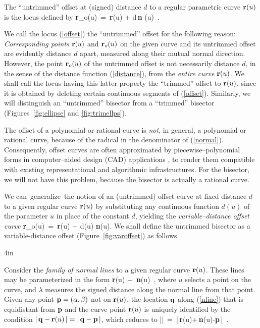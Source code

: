 \begin{dfn}
The ``untrimmed'' offset at (signed) distance $d$ to a regular parametric
curve ${\bf r}(u)$ is the locus defined by
\be \label{offset}
{\bf r}_o(u) \,=\, {\bf r}(u) + d\,{\bf n} (u) \,.
\ee
\end{dfn}

We call the locus (\ref{offset}) the ``untrimmed'' offset for the
following reason: {\it Corresponding points\/} ${\bf r}(u)$ and
${\bf r}_o(u)$ on the given curve and its untrimmed offset are
evidently distance $d$ apart, measured along their mutual normal
direction. However, the point ${\bf r}_o(u)$ of the untrimmed offset
is not necessarily distance $d$, in the sense of the distance function
(\ref{distance}), from the {\it entire curve\/} ${\bf r}(u)$. We shall
call the locus having this latter property the ``trimmed'' offset to
${\bf r}(u)$, since it is obtained by deleting certain continuous
segments of (\ref{offset}).
Similarly, we will distinguish an ``untrimmed'' bisector from 
a ``trimmed'' bisector (Figures~\ref{fig:ellipse} and \ref{fig:trimellps}).

The offset of a polynomial or rational curve 
is {\it not}, in general, a polynomial or rational curve, 
because of the radical in the denominator of (\ref{normal}).
Consequently, offset curves are often approximated
by piecewise--polynomial forms in computer--aided design (CAD)
applications \cite{hoschek88,klass83,pham88,tiller84}, to render
them compatible with existing representational and algorithmic
infrastructures. 
For the bisector, we will not have this problem, because the bisector
is actually a rational curve.

We \mbox{can generalize the} notion of an (untrimmed) offset curve at fixed
distance $d$ to a given regular curve ${\bf r}(u)$ by substituting
any continuous function $d(u)$ of the parameter $u$ in place of the
constant $d$, yielding the {\it variable--distance
offset curve}
\be \label{varoffset}
{\bf r}_o(u) \,=\, {\bf r}(u) + d(u) {\bf n}(u).
\ee
We shall define the untrimmed bisector as a variable-distance offset
(Figure~\ref{fig:varoffset}) as follows.

{4in} %

Consider the {\it family of normal lines\/} to a given regular curve
${\bf r}(u)$. These lines may be parameterized in the form
\be \label{nline}
{\bf r}(u) + \lambda\,{\bf n}(u) \,,
\ee
where $u$ selects a point on the curve, and $\lambda$ measures the
signed distance along the normal line from that point. Given any point
${\bf p} = (\alpha, \beta)$ not on ${\bf r}(u)$, the location ${\bf q}$
along (\ref{nline}) that is equidistant from ${\bf p}$ and
the curve point ${\bf r}(u)$ is uniquely identified by the condition
$|\,{\bf q}-{\bf r}(u)\,|=|\,{\bf q}-{\bf p}\,|$, which reduces to
\be \label{lambda}
|\lambda| \,=\, |\,{\bf r}(u)+\lambda\,{\bf n}(u)-{\bf p}\,| \,.
\ee

